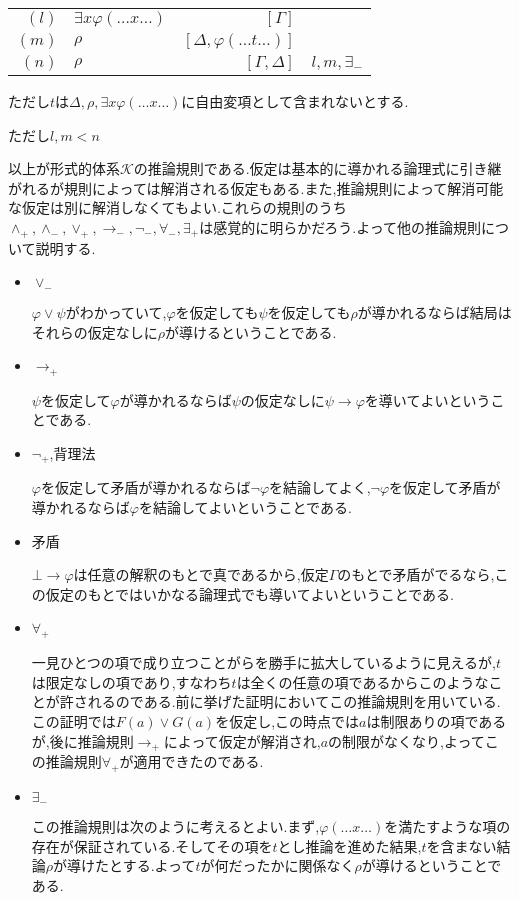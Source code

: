 \documentclass[10pt,b5paper,papersize,dvipdfmx]{jsbook}
\begin{document}
\begin{itemize}
\begin{itemize}
\begin{table}[H]
\begin{center}
\begin{tabular}{rlrl}
$(l)$&$\exists x\varphi(\dots x \dots)$&$[\Gamma]$& \\
$(m)$&$\rho$&$[\Delta,\varphi(\dots t \dots)]$& \\
$(n)$&$\rho$&$[\Gamma,\Delta]$&$l,m,\exists_-$
\end{tabular}
\end{center}
\end{table}
ただし$t$は$\Delta,\rho,\exists x\varphi(\dots x \dots)$に自由変項として含まれないとする. \par
ただし$l,m<n$
\end{itemize}
\end{itemize}
以上が形式的体系$\mathcal K$の推論規則である.仮定は基本的に導かれる論理式に引き継がれるが規則によっては解消される仮定もある.また,推論規則によって解消可能な仮定は別に解消しなくてもよい.これらの規則のうち$\land_+,\land_-,\lor_+,\to_-,\lnot_-,\forall_-,\exists_+$は感覚的に明らかだろう.よって他の推論規則について説明する.
\begin{itemize}
\item $\lor_-$ \par
$\varphi \lor \psi$がわかっていて,$\varphi$を仮定しても$\psi$を仮定しても$\rho$が導かれるならば結局はそれらの仮定なしに$\rho$が導けるということである.
\item $\to_+$ \par
$\psi$を仮定して$\varphi$が導かれるならば$\psi$の仮定なしに$\psi \to \varphi$を導いてよいということである.
\item $\lnot_+$,背理法 \par
$\varphi$を仮定して矛盾が導かれるならば$\lnot \varphi$を結論してよく,$\lnot \varphi$を仮定して矛盾が導かれるならば$\varphi$を結論してよいということである.
\item 矛盾 \par
$\bot \to \varphi$は任意の解釈のもとで真であるから,仮定$\Gamma$のもとで矛盾がでるなら,この仮定のもとではいかなる論理式でも導いてよいということである.
\item $\forall_+$ \par
一見ひとつの項で成り立つことがらを勝手に拡大しているように見えるが,$t$は限定なしの項であり,すなわち$t$は全くの任意の項であるからこのようなことが許されるのである.前に挙げた証明においてこの推論規則を用いている.この証明では$F(a)\lor G(a)$を仮定し,この時点では$a$は制限ありの項であるが,後に推論規則$\to_+$によって仮定が解消され,$a$の制限がなくなり,よってこの推論規則$\forall_+$が適用できたのである.
\item $\exists_-$ \par
この推論規則は次のように考えるとよい.まず,$\varphi(\dots x \dots)$を満たすような項の存在が保証されている.そしてその項を$t$とし推論を進めた結果,$t$を含まない結論$\rho$が導けたとする.よって$t$が何だったかに関係なく$\rho$が導けるということである.
\end{itemize}
\end{document}
